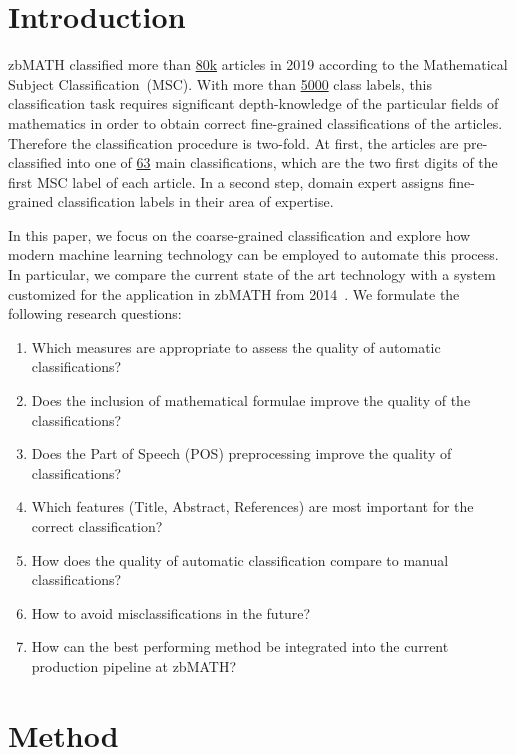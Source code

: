 \section{Introduction}\label{sec:intro}
zbMATH classified more than 
\href{https://zbmath.org/?q=%2A+py%3A2019}%
{80k} articles in 2019 according to the Mathematical Subject Classification~(MSC).
With more than
\href{https://msc2020.org}%
{5000} class labels, this classification task requires significant depth-knowledge of the particular fields of mathematics in order to obtain correct fine-grained classifications of the articles.
Therefore the classification procedure is two-fold.
At first, the articles are pre-classified into one of \href{https://msc2020.org}%
{63} main classifications, which are the two first digits of the first MSC label of each article.
In a second step, domain expert assigns fine-grained classification labels in their area of expertise.

In this paper, we focus on the coarse-grained classification and explore how modern machine learning technology can be employed to automate this process.
In particular, we compare the current state of the art technology with a system customized for the application in zbMATH from 2014~\cite{SchonebergS14}.
We formulate the following research questions:
\begin{enumerate}
  \item Which measures are appropriate to assess the quality of automatic classifications?
  \item Does the inclusion of mathematical formulae improve the quality of the classifications?
  \item Does the Part of Speech (POS) preprocessing improve the quality of classifications?
  \item Which features (Title, Abstract, References) are most important for the correct classification?
  \item How does the quality of automatic classification compare to manual classifications?
  \item How to avoid misclassifications in the future?
  \item How can the best performing method be integrated into the current production pipeline at zbMATH?
\end{enumerate}
\section{Method}\label{sec:method}


